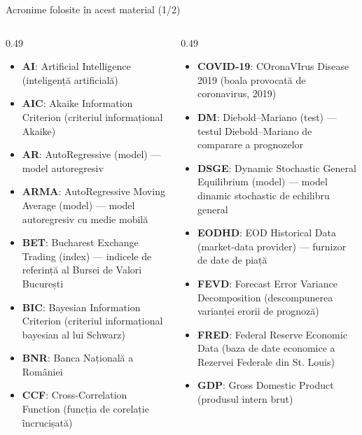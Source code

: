 {
\begin{frame}[noframenumbering]
    \titlepage
\end{frame}
}
\begin{frame}{Acronime folosite în acest material (1/2)}
\begin{columns}[T]
\begin{column}{0.49\textwidth}
\begin{itemize}\setlength{\itemsep}{0pt}
    \item \textbf{AI}: Artificial Intelligence (inteligență artificială)
    \item \textbf{AIC}: Akaike Information Criterion (criteriul informațional Akaike)
    \item \textbf{AR}: AutoRegressive (model) — model autoregresiv
    \item \textbf{ARMA}: AutoRegressive Moving Average (model) — model autoregresiv cu medie mobilă
    \item \textbf{BET}: Bucharest Exchange Trading (index) — indicele de referință al Bursei de Valori București
    \item \textbf{BIC}: Bayesian Information Criterion (criteriul informațional bayesian al lui Schwarz)
    \item \textbf{BNR}: Banca Națională a României
    \item \textbf{CCF}: Cross-Correlation Function (funcția de corelație încrucișată)
\end{itemize}
\end{column}
\begin{column}{0.49\textwidth}
\begin{itemize}\setlength{\itemsep}{0pt}
    \item \textbf{COVID-19}: COronaVIrus Disease 2019 (boala provocată de coronavirus, 2019)
    \item \textbf{DM}: Diebold–Mariano (test) — testul Diebold–Mariano de comparare a prognozelor
    \item \textbf{DSGE}: Dynamic Stochastic General Equilibrium (model) — model dinamic stochastic de echilibru general
    \item \textbf{EODHD}: EOD Historical Data (market-data provider) — furnizor de date de piață
    \item \textbf{FEVD}: Forecast Error Variance Decomposition (descompunerea varianței erorii de prognoză)
    \item \textbf{FRED}: Federal Reserve Economic Data (baza de date economice a Rezervei Federale din St. Louis)
    \item \textbf{GDP}: Gross Domestic Product (produsul intern brut)
\end{itemize}
\end{column}
\end{columns}
\end{frame}
